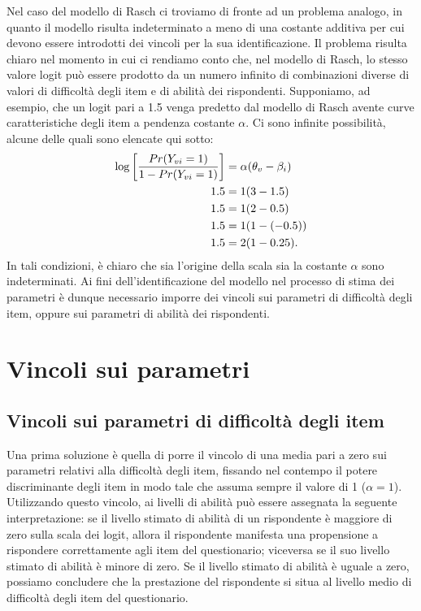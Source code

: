 Nel caso del modello di Rasch ci troviamo di fronte ad un problema
analogo, in quanto il modello risulta indeterminato a meno di una
costante additiva per cui devono essere introdotti dei vincoli per la
sua identificazione. Il problema risulta chiaro nel momento in cui ci
rendiamo conto che, nel modello di Rasch, lo stesso valore logit può
essere prodotto da un numero infinito di  combinazioni diverse di valori di
difficoltà degli item e di abilità dei rispondenti. Supponiamo, ad esempio, che un
logit pari a 1.5 venga predetto dal modello di Rasch avente curve
caratteristiche degli item a pendenza costante $\alpha$. Ci sono infinite possibilità, alcune delle quali sono elencate qui sotto:
\begin{align} 
  \log\left[\frac{Pr(Y_{vi} = 1)}{1-Pr(Y_{vi} = 1)}\right] &=
  \alpha(\theta_v-\beta_i)\notag\\
  1.5 &= 1(3-1.5)\notag\\
  1.5 &= 1(2-0.5)\notag\\
  1.5 &= 1(1-(-0.5))\notag\\
  1.5 &= 2(1-0.25).
\end{align}
In tali condizioni, è chiaro che sia l'origine della scala sia la costante $\alpha$ sono
indeterminati. Ai fini dell'identificazione del modello nel processo di stima dei parametri è dunque necessario imporre dei vincoli sui parametri di difficoltà degli item, oppure sui parametri di abilità dei rispondenti.

\section{Vincoli sui parametri}
\label{vincoli}

\subsection{Vincoli sui parametri di difficoltà degli item}

Una prima soluzione è quella di porre il vincolo di una media pari a zero sui parametri relativi alla difficoltà degli item, fissando nel contempo il potere discriminante degli item in modo tale che assuma sempre il valore di 1 ($\alpha=1$). Utilizzando questo vincolo, ai livelli di abilità può essere assegnata la seguente interpretazione: se il livello stimato di abilità di un rispondente è maggiore di zero sulla scala dei logit, allora il rispondente  manifesta una propensione a rispondere correttamente agli item del questionario; viceversa se il suo livello stimato di abilità è minore di zero. Se il livello stimato di abilità è
uguale a zero, possiamo concludere che la prestazione del rispondente si situa al livello medio di difficoltà degli item del questionario.

